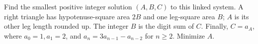 Find the smallest positive integer solution $(A,B,C)$ to this linked system. A right triangle has hypotenuse-square area $2B$ and one leg-square area $B$; $A$ is its other leg length rounded up. The integer $B$ is the digit sum of $C$. Finally, $C=a_A$, where $a_0=1,a_1=2$, and $a_n=3a_{n-1}-a_{n-2}$ for $n\ge2$. Minimize $A$.
